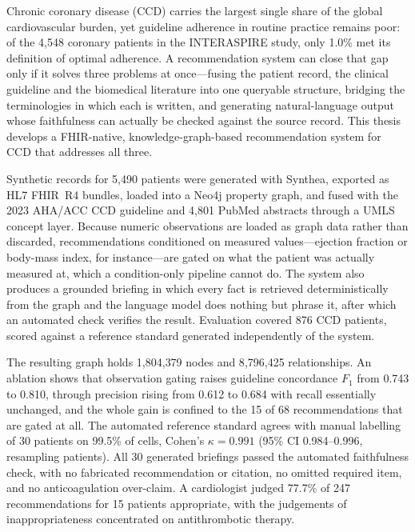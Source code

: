 \begin{singlespace}
{\itshape

\indent Chronic coronary disease (CCD) carries the largest single share of the global
cardiovascular burden, yet guideline adherence in routine practice remains poor: of the
4{,}548 coronary patients in the INTERASPIRE study, only 1.0\% met its definition of optimal
adherence. A recommendation system can close that gap only if it solves three problems at
once---fusing the patient record, the clinical guideline and the biomedical literature into
one queryable structure, bridging the terminologies in which each is written, and generating
natural-language output whose faithfulness can actually be checked against the source
record. This thesis develops a FHIR-native, knowledge-graph-based recommendation system
for CCD that addresses all three.

Synthetic records for 5{,}490 patients were generated with Synthea, exported as HL7 FHIR~R4
bundles, loaded into a Neo4j property graph, and fused with the 2023 AHA/ACC CCD guideline
and 4{,}801 PubMed abstracts through a UMLS concept layer. Because numeric observations are
loaded as graph data rather than discarded, recommendations conditioned on measured
values---ejection fraction or body-mass index, for instance---are gated on what the patient
was actually measured at, which a condition-only pipeline cannot do. The system also
produces a grounded briefing in which every fact is retrieved deterministically from the
graph and the language model does nothing but phrase it, after which an automated check
verifies the result. Evaluation covered 876 CCD patients, scored against a reference
standard generated independently of the system.

The resulting graph holds 1{,}804{,}379 nodes and 8{,}796{,}425 relationships. An ablation
shows that observation gating raises guideline concordance $F_1$ from 0.743 to 0.810,
through precision rising from 0.612 to 0.684 with recall essentially unchanged, and the
whole gain is confined to the 15 of 68 recommendations that are gated at all. The automated
reference standard agrees with manual labelling of 30 patients on 99.5\% of cells, Cohen's
$\kappa = 0.991$ (95\% CI 0.984--0.996, resampling patients). All 30 generated briefings passed the automated faithfulness check, with no
fabricated recommendation or citation, no omitted required item, and no anticoagulation
over-claim. A cardiologist judged 77.7\% of 247 recommendations for 15 patients appropriate,
with the judgements of inappropriateness concentrated on antithrombotic therapy.

}
\end{singlespace}
